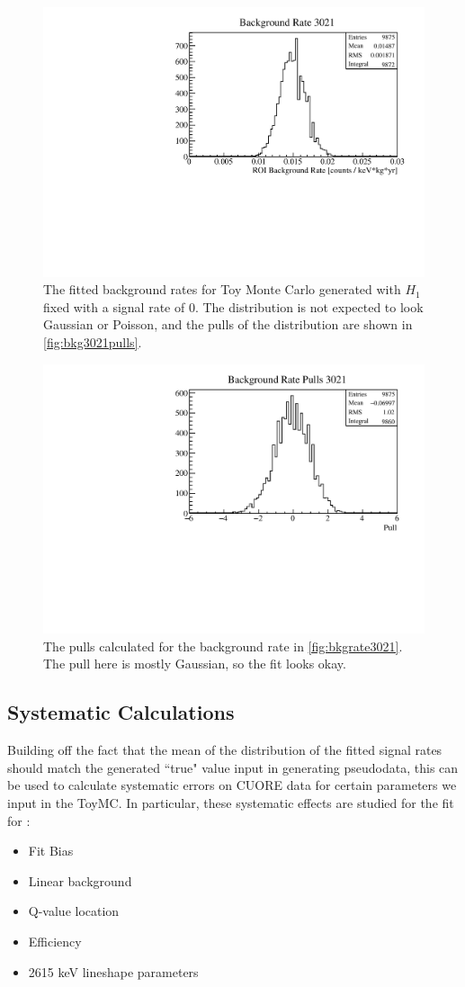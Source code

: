 \begin{figure}
\centering
\includegraphics[width=0.7\linewidth]{Figures/Appendix_Figures/Bkg3021Rate.pdf}
\caption[The fitted background rates for Toy Monte Carlo generated with $H_1$ fixed with a signal rate of 0]{The fitted background rates for Toy Monte Carlo generated with $H_1$ fixed with a signal rate of 0.
The distribution is not expected to look Gaussian or Poisson, and the pulls of the distribution are shown in \autoref{fig:bkg3021pulls}.}
\label{fig:bkgrate3021}
\end{figure}

\begin{figure}
\centering
\includegraphics[width=0.7\linewidth]{Figures/Appendix_Figures/Bkg3021Pulls.pdf}
\caption{The pulls calculated for the background rate in \autoref{fig:bkgrate3021}.
The pull here is mostly Gaussian, so the fit looks okay.}
\label{fig:bkg3021pulls}
\end{figure}

\subsection*{Systematic Calculations}
\label{ssec:Systematic Calculations}
Building off the fact that the mean of the distribution of the fitted signal rates should match the generated ``true" value input in generating pseudodata, this can be used to calculate systematic errors on CUORE data for certain parameters we input in the ToyMC.
In particular, these systematic effects are studied for the fit for \zeronubb:
\begin{itemize}
\item Fit Bias
\item Linear background
\item Q-value location
\item Efficiency
\item 2615 keV lineshape parameters
\end{itemize}

